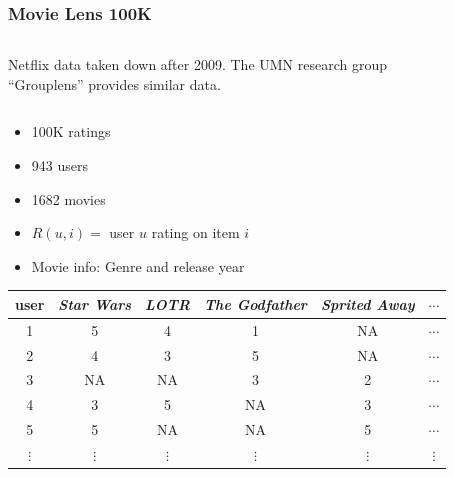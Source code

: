 \documentclass[table]{beamer}
\begin{document}
\begin{frame}
\frametitle{Movie Lens 100K}
    \begin{columns}[t]
    Netflix data taken down after 2009.  The UMN research group ``Grouplens''
      provides similar data.
      \begin{figure}
      \end{figure}
    \end{columns}
  \begin{itemize}
    \item 100K ratings
    \item 943 users
    \item 1682 movies
    \item $R(u, i) = $ user $u$ rating on item $i$
    \item Movie info: Genre and release year
  \end{itemize}

 \begin{table}[ht]
\centering
    \begin{tabular}{|cccccc|}
      \hline
        \tiny{user} & \tiny{\emph{Star Wars}} & \tiny{\emph{LOTR}} &
        \tiny{\emph{The Godfather}} &
         \tiny{\emph{Sprited Away}} &
         $\cdots$  \\
           \hline
         1 &  5  & 4  & 1  & NA  & $\cdots$   \\
         2 &  4  & 3  & 5  & NA  & $\cdots$   \\
         3 &  NA & NA & 3  & 2   & $\cdots$   \\
         4 &  3  & 5  & NA & 3   & $\cdots$   \\
         5 &  5  & NA & NA & 5   & $\cdots$   \\
      $\vdots$ & $\vdots$ & $\vdots$ & $\vdots$ & $\vdots$ & $\vdots$  \\
         \hline
    \end{tabular}
  \end{table}
\end{frame}
\end{document}
